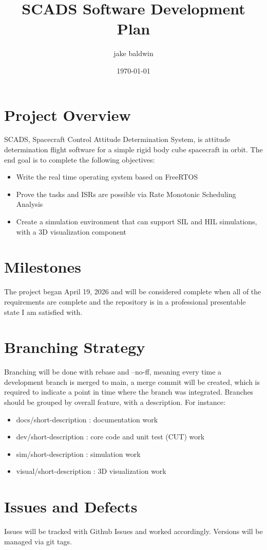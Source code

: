 \documentclass{article}
\title{SCADS Software Development Plan}
\author{jake baldwin}
\date{\today}
\begin{document}
    \maketitle

    \section{Project Overview}
    SCADS, Spacecraft Control Attitude Determination System, is attitude 
    determination flight software for a simple rigid body cube spacecraft in 
    orbit. The end goal is to complete the following objectives: 
        \begin{itemize}
            \item Write the real time operating system based on FreeRTOS
            \item Prove the tasks and ISRs are possible via Rate Monotonic
                Scheduling Analysis
            \item Create a simulation environment that can support SIL and HIL
                simulations, with a 3D visualization component
        \end{itemize}

    \section{Milestones}
    The project began April 19, 2026 and will be considered complete when all 
    of the requirements are complete and the repository is in a professional 
    presentable state I am satisfied with.

    \section{Branching Strategy}
    Branching will be done with rebase and --no-ff, meaning every time a 
    development branch is merged to main, a merge commit will be created, 
    which is required to indicate a point in time where the branch was 
    integrated. Branches should be grouped by overall feature, with a description. For
    instance:
    \begin{itemize}
        \item docs/short-description : documentation work
        \item dev/short-description : core code and unit test (CUT) work
        \item sim/short-description : simulation work
        \item visual/short-description : 3D visualization work
    \end{itemize}

    \section{Issues and Defects}
    Issues will be tracked with Github Issues and worked accordingly. Versions
    will be managed via git tags.
\end{document}
